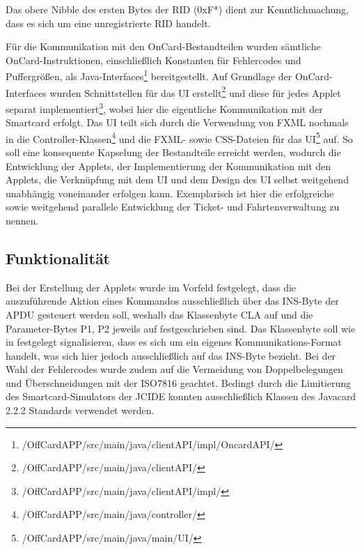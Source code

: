 \documentclass[	a4paper,
			11pt,
			oneside,
			parskip]{scrartcl}
\begin{document}
Das obere Nibble des ersten Bytes der RID (0xF*) dient zur Kenntlichmachung, dass es sich um eine unregistrierte RID handelt.

Für die Kommunikation mit den OnCard-Bestandteilen wurden sämtliche OnCard-Instruktionen, einschließlich Konstanten für Fehlercodes und Puffergrößen, als Java-Interfaces\footnote{\glqq /OffCardAPP/src/main/java/clientAPI/impl/OncardAPI/\grqq} bereitgestellt. Auf Grundlage der OnCard-Interfaces wurden Schnittstellen für das 
UI erstellt\footnote{\glqq /OffCardAPP/src/main/java/clientAPI/\grqq} und diese für jedes Applet separat implementiert\footnote{\glqq /OffCardAPP/src/main/java/clientAPI/impl/\grqq}, wobei hier die eigentliche Kommunikation mit der Smartcard erfolgt. Das UI teilt sich durch die Verwendung von FXML nochmals in die Controller-Klassen\footnote{\glqq /OffCardAPP/src/main/java/controller/\grqq} und die FXML- sowie CSS-Dateien für das
UI\footnote{\glqq /OffCardAPP/src/main/java/main/UI/\grqq} auf. So soll eine konsequente Kapselung der Bestandteile erreicht werden, wodurch die Entwicklung der Applets, der Implementierung der Kommunikation mit den
Applets, die Verknüpfung mit dem UI und dem Design des UI selbst weitgehend unabhängig voneinander erfolgen kann. Exemplarisch ist hier die erfolgreiche sowie weitgehend parallele Entwicklung der Ticket- und Fahrtenverwaltung zu nennen.

\subsection{Funktionalität}
Bei der Erstellung der Applets wurde im Vorfeld festgelegt, dass die auszuführende Aktion eines Kommandos ausschließlich über das INS-Byte der APDU gesteuert werden soll, weshalb das Klassenbyte CLA auf  und die Parameter-Bytes P1, P2 jeweils auf  festgeschrieben sind. Das Klassenbyte soll wie in \cite{ISO7816.2015} festgelegt signalisieren, dass es sich um ein eigenes Kommunikations-Format handelt, was sich hier jedoch ausschließlich auf das INS-Byte bezieht. Bei der Wahl der Fehlercodes wurde zudem auf die Vermeidung von Doppelbelegungen und Überschneidungen mit der ISO7816 geachtet. Bedingt durch die Limitierung des Smartcard-Simulators der JCIDE konnten ausschließlich Klassen des Javacard 2.2.2 Standards verwendet werden.
\end{document}

